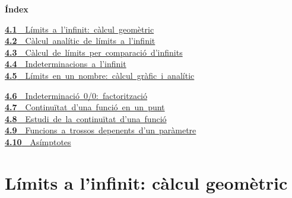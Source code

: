 \documentclass[11pt,a4paper]{article}
\begin{document}
\begin{tcolorbox}[colback=fmsurface,colframe=fmsurface,arc=3mm,left=4mm,right=4mm,top=2mm,bottom=2mm]
\small\textbf{Índex}\par\smallskip
\begin{minipage}[t]{0.49\linewidth}\small \mbox{\hyperlink{sec1}{\textbf{\color{fmgreen}4.1}\ \ Límits a l'infinit: càlcul geomètric}}\\[3pt]
\mbox{\hyperlink{sec2}{\textbf{\color{fmgreen}4.2}\ \ Càlcul analític de límits a l'infinit}}\\[3pt]
\mbox{\hyperlink{sec3}{\textbf{\color{fmgreen}4.3}\ \ Càlcul de límits per comparació d'infinits}}\\[3pt]
\mbox{\hyperlink{sec4}{\textbf{\color{fmgreen}4.4}\ \ Indeterminacions a l'infinit}}\\[3pt]
\mbox{\hyperlink{sec5}{\textbf{\color{fmgreen}4.5}\ \ Límits en un nombre: càlcul gràfic i analític}}\\[3pt]\end{minipage}\hfill\begin{minipage}[t]{0.49\linewidth}\small \mbox{\hyperlink{sec6}{\textbf{\color{fmgreen}4.6}\ \ Indeterminació 0/0: factorització}}\\[3pt]
\mbox{\hyperlink{sec7}{\textbf{\color{fmgreen}4.7}\ \ Continuïtat d'una funció en un punt}}\\[3pt]
\mbox{\hyperlink{sec8}{\textbf{\color{fmgreen}4.8}\ \ Estudi de la continuïtat d'una funció}}\\[3pt]
\mbox{\hyperlink{sec9}{\textbf{\color{fmgreen}4.9}\ \ Funcions a trossos depenents d'un paràmetre}}\\[3pt]
\mbox{\hyperlink{sec10}{\textbf{\color{fmgreen}4.10}\ \ Asímptotes}}\\[3pt]\end{minipage}
\end{tcolorbox}

\section{Límits a l'infinit: càlcul geomètric}\hypertarget{sec1}{}

  
\end{document}

